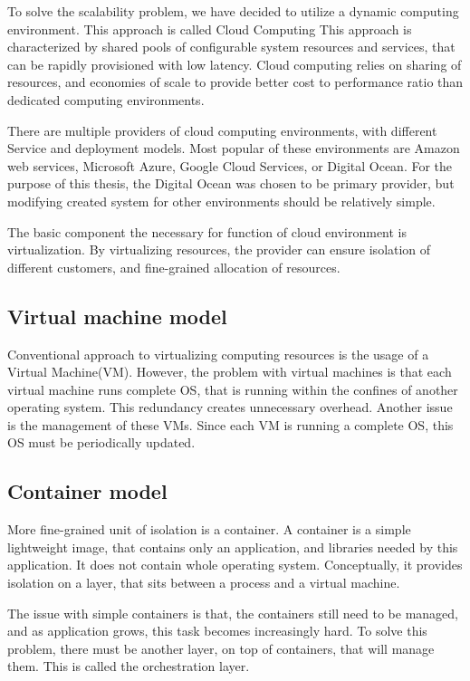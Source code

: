 To solve the scalability problem, we have decided to utilize a dynamic computing environment. This approach is called Cloud Computing\cite{wiki:cloud}
This approach is characterized by shared pools of configurable system resources and services, that can be rapidly provisioned
with low latency. Cloud computing relies on sharing of resources, and economies of scale to provide better
cost to performance ratio than dedicated computing environments.

There are multiple providers of cloud computing environments, with different Service and deployment models.
Most popular of these environments are Amazon web services, Microsoft Azure, Google Cloud Services, or Digital Ocean. For the purpose of
this thesis, the Digital Ocean was chosen to be primary provider, but modifying created system for other
environments should be relatively simple.

The basic component the necessary for function of cloud environment is virtualization. By virtualizing resources,
the provider can ensure isolation of different customers, and fine-grained allocation of resources.

\subsection{Virtual machine model}
Conventional approach to virtualizing computing resources is the usage of a Virtual Machine(VM).
However, the problem with virtual machines is that each virtual machine runs complete OS, that is
running within the confines of another operating system. This redundancy creates unnecessary overhead.
Another issue is the management of these VMs. Since each VM is running a complete OS,
this OS must be periodically updated.

\subsection{Container model}
More fine-grained unit of isolation is a container. A container is a simple lightweight image, that contains
only an application, and libraries needed by this application. It does not contain whole operating system.
Conceptually, it provides isolation on a layer, that sits between a process and a virtual machine.

The issue with simple containers is that, the containers still need to be managed, and as application
grows, this task becomes increasingly hard. To solve this problem, there must be another layer, on top of containers,
that will manage them. This is called the orchestration layer.

